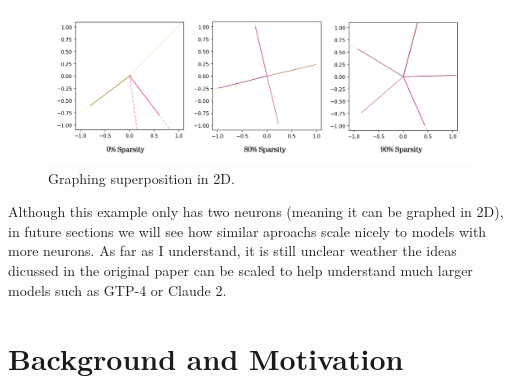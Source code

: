 \documentclass{article} %
\begin{document}
\begin{figure}[h]
    \centering
    \includegraphics[width=0.68\linewidth]{section_1/images/section1_replicated_graphic.png}
    \captionsetup{font=footnotesize} %
    \caption{Graphing superposition in 2D.}
    \label{fig:section1_replication}
\end{figure}

Although this example only has two neurons (meaning it can be graphed in 2D), in
future sections we will see how similar aproachs scale nicely to models with more neurons.
As far as I understand, it is still unclear weather the ideas 
dicussed in the original paper can be scaled to help understand 
much larger models such as GTP-4 or Claude 2.



\section{Background and Motivation}
\end{document}
